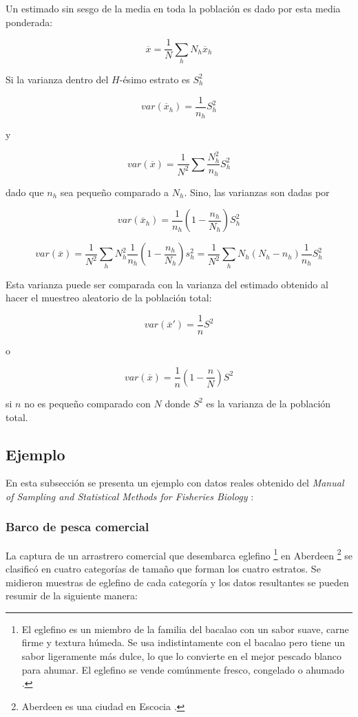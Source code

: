 Un estimado sin sesgo de la media en toda la población es dado por esta media ponderada:

$$
\overline{x} = \frac{1}{N} \sum \limits_{h} N_h \overline{x}_h
$$

Si la varianza dentro del $H$-ésimo estrato es $S_h^2$

$$
var(\overline{x}_h) = \frac{1}{n_h} S_h^2
$$

y

$$
var(\overline{x}) = \frac{1}{N^2} \sum \frac{N_h^2}{n_h}S_h^2
$$

dado que $n_h$ sea pequeño comparado a $N_h$. Sino, las varianzas son dadas por

$$
var(\overline{x}_h) = \frac{1}{n_h}(1 - \frac{n_h}{N_h})S_h^2
$$


$$
var(\overline{x}) = \frac{1}{N^2} \sum \limits_h N_h^2 \frac{1}{n_h}(1 - \frac{n_h}{N_h})s_h^2 = \frac{1}{N^2} \sum \limits_h N_h (N_h - n_h) \frac{1}{n_h} S_h^2
$$

Esta varianza puede ser comparada con la varianza del estimado obtenido al hacer el muestreo aleatorio de la población total:

$$
var(\overline{x}') = \frac{1}{n}S^2
$$

o

$$
var(\overline{x}) = \frac{1}{n}(1 - \frac{n}{N})S^2
$$

si $n$ no es pequeño comparado con $N$ donde $S^2$ es la varianza de la población total.

\subsection{Ejemplo}

En esta subsección se presenta un ejemplo con datos reales obtenido del \textit{Manual of Sampling and Statistical Methods for Fisheries Biology} \cite{gulland-1966}:

\bigbreak

\subsubsection{Barco de pesca comercial}

La captura de un arrastrero comercial que desembarca eglefino \footnote{El eglefino es un miembro de la familia del bacalao con un sabor suave, carne firme y textura húmeda. Se usa indistintamente con el bacalao pero tiene un sabor ligeramente más dulce, lo que lo convierte en el mejor pescado blanco para ahumar. El eglefino se vende comúnmente fresco, congelado o ahumado \cite{sustainable-fishing-msc-marine-stewardship-council-2021}.} en Aberdeen \footnote{Aberdeen es una ciudad en Escocia \cite{wikipedia-aberdeen-2021}.} se clasificó en cuatro categorías de tamaño que forman los cuatro estratos. Se midieron muestras de eglefino de cada categoría y los datos resultantes se pueden resumir de la siguiente manera:

